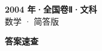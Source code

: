 \documentclass[zihao=-4, a4paper]{ctexart}
\begin{document}
\begin{center}
  {\Large\bfseries 2004 年·全国卷Ⅱ·文科}\\[4pt]
  {\large 数学 · 简答版}
\end{center}
\medskip
{}

\clearpage
{}
\begin{center}{\Large\bfseries 答案速查}\end{center}
\medskip

\end{document}
